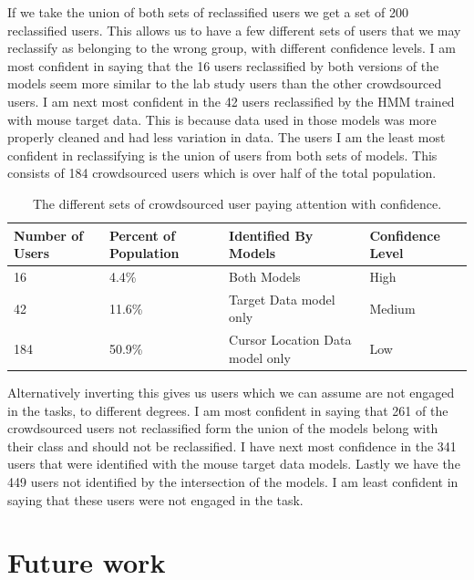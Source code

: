 \documentclass{article}
\begin{document}
If we take the union of both sets of reclassified users we get a set of 200 reclassified users.
This allows us to have a few different sets of users that we may reclassify as belonging to the wrong group, with different confidence levels.
I am most confident in saying that the 16 users reclassified by both versions of the models seem more similar to the lab study users than the other crowdsourced users.
I am next most confident in the 42 users reclassified by the HMM trained with mouse target data.
This is because data used in those models was more properly cleaned and had less variation in data.
The users I am the least most confident in reclassifying is the union of users from both sets of models.
This consists of 184 crowdsourced users which is over half of the total population.

\begin{table}[ht]
    \caption{\label{table:usersattention} The different sets of crowdsourced user paying attention with confidence.}
    \small
    \begin{tabular}{llll}
        \hline
        Number of Users & Percent of Population & Identified By Models             & Confidence Level \\  \hline
        16              & 4.4\%                 & Both Models                      & High  \\
        42              & 11.6\%                & Target Data model only           & Medium  \\  
        184             & 50.9\%                & Cursor Location Data model only  & Low  \\  \hline
    \end{tabular}
\end{table}

Alternatively inverting this gives us users which we can assume are not engaged in the tasks, to different degrees.
I am most confident in saying that 261 of the crowdsourced users not reclassified form the union of the models belong with their class and should not be reclassified.
I have next most confidence in the 341 users that were identified with the mouse target data models.
Lastly we have the 449 users not identified by the intersection of the models.
I am least confident in saying that these users were not engaged in the task.

\section{Future work}
\end{document}

